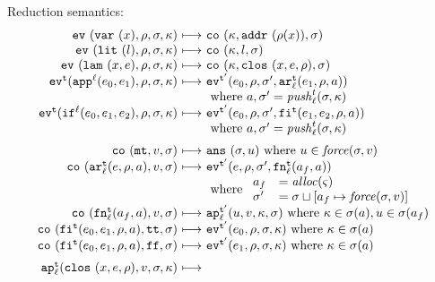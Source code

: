 \documentclass{llncs}
\begin{document}
Reduction semantics:
\begin{gather*}
\begin{array}{@{}r@{\ }c@{\ }l@{}}
\ev{\svar\mvar,\menv,\msto,\mkont} &\machstep&
\co{\mkont, \spchoice{\saddr{\menv(\mvar)}}{\superposition{\msto(\menv(\mvar))}},\msto}
\\
\ev{\slit\mlit,\menv,\msto,\mkont} &\machstep&
\co{\mkont,\mlit,\msto}
\\
\ev{\slam\mvar\mexp,\menv,\msto,\mkont} &\machstep&
\co{\mkont,\clos{\mvar,\mexp,\menv},\msto}
\\
\ev[^\mcntr]{\sapp[^\mlab]{\mexpi0}{\mexpi1},\menv,\msto,\mkont} &\machstep&
\ev[^{\mcntr'}]{\mexpi{0},\menv,\msto',\kar[_\mlab^\mcntr]{\mexpi{1},\menv,\maddr}}
\\
&&
\text{ where }\maddr,\msto' = \push^\mcntr_\mlab(\msto,\mkont)
\\
\ev[^\mcntr]{\sif[^\mlab]{\mexpi0}{\mexpi1}{\mexpi2},\menv,\msto,\mkont} &\machstep&
\ev[^{\mcntr'}]{\mexpi0,\menv,\msto',\kif[^\mcntr]{\mexpi1,\mexpi2,\menv,\maddr}}
\\
&&
\text{ where }\maddr,\msto' = \push_\mlab^\mcntr(\msto,\mkont)
\\[2mm]
\co{\kmt,\mval,\msto} &\machstep&
\ans{\msto,\mvalx{u}}
\text{ where } \mvalx{u} \in \spchoice{\force(\msto, \mval)}{\force(\mval)}
\\
\co{\kar[^\mcntr_\mlab]{\mexp,\menv,\maddr},\mval,\msto} & \machstep&
\ev[^{\mcntr'}]{\mexp,\menv,\msto',\kfn[^\mcntr_\mlab]{\maddr_f,\maddr}}
\\
&&
\text{ where }
\begin{array}{ll}
 \maddr_f &= \alloc(\mstate)\\
 \msto' &= \msto\sqcup[\maddr_f\mapsto\spchoice{\force(\msto,\mval)}{\force(\mval)}]
\end{array}
\\
\co{\kfn[^\mcntr_\mlab]{\maddr_f,\maddr},\mval,\msto} & \machstep&
\ap[^{\mcntr'}_\mlab]{\mvalx{u},\mval,\mkont,\msto}
\text{ where } \mkont \in \msto(\maddr), \mvalx{u} \in \msto(\maddr_f)
\\
\co{\kif[^\mcntr]{\mexpi0,\mexpi1,\menv,\maddr},\strue,\msto} & \machstep&
\ev[^{\mcntr'}]{\mexpi0,\menv,\msto,\mkont}
\text{ where }\mkont\in\msto(\maddr)
\\
\co{\kif[^\mcntr]{\mexpi0,\mexpi1,\menv,\maddr},\sfalse,\msto} & \machstep&
\ev[^{\mcntr'}]{\mexpi1,\menv,\msto,\mkont}
\text{ where }\mkont\in\msto(\maddr)
\\[2mm]
\ap[^\mcntr_\mlab]{\clos{\mvar,\mexp,\menv},\mval,\msto,\mkont} & \machstep&

\end{array}
\end{gather*}
\end{document}
